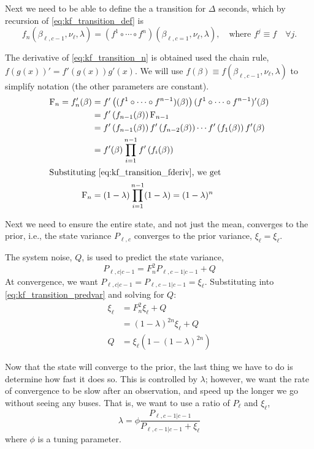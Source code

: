 \documentclass[english]{MastersDoctoralThesis}\usepackage[]{graphicx}\usepackage[]{color}
\begin{document}
Next we need to be able to define the a transition for $\Delta$ seconds,
which by recursion of \ref{eq:kf_transition_def} is
\begin{equation}
    \label{eq:kf_transition_n}
    f_n(\beta_{\ell,c-1}, \nu_\ell, \lambda) =
    (f^1 \circ \cdots \circ f^n)(\beta_{\ell,c=1}, \nu_\ell, \lambda), \quad\text{where } f^j\equiv f\quad \forall j.
\end{equation}

The derivative of \ref{eq:kf_transition_n} is obtained used the chain rule,
$f(g(x))' = f'(g(x)) g'(x)$.
We will use $f(\beta) \equiv f(\beta_{\ell,c-1},\nu_\ell,\lambda)$ to simplify notation
(the other parameters are constant).
\begin{align}
    \label{eq:kf_transition_F}
    \mathrm{F}_n = f'_n(\beta) &=
    f'\left((f^1\circ\cdots\circ f^{n-1})(\beta)\right)(f^1\circ\cdots\circ f^{n-1})'(\beta) \nonumber \\
    &= f'\left(f_{n-1}(\beta)\right) \mathrm{F}_{n-1} \nonumber \\
    &= f'\left(f_{n-1}(\beta)\right) f'\left(f_{n-2}(\beta)\right) \cdots f'\left(f_1(\beta)\right) f'(\beta) \nonumber \\
    &= f'(\beta) \prod_{i=1}^{n-1} f'\left(f_i(\beta)\right) \nonumber \\
\intertext{Substituting \ref{eq:kf_transition_fderiv}, we get}
    \mathrm{F}_n &= (1-\lambda) \prod_{i=1}^{n-1}(1-\lambda) = (1-\lambda)^n
\end{align}


Next we need to ensure the entire state, and not just the mean,
converges to the prior,
i.e., the state variance $P_{\ell,c}$ converges to the prior variance, $\xi_{\ell} = \xi_\ell$.

The system noise, $Q$, is used to predict the state variance,
\begin{equation}
    \label{eq:kf_transition_predvar}
    P_{\ell,c|c-1} = F_n^2 P_{\ell,c-1|c-1} + Q
\end{equation}
At convergence, we want $P_{\ell,c|c-1} = P_{\ell,c-1|c-1} = \xi_\ell$.
Substituting into \ref{eq:kf_transition_predvar} and solving for $Q$:
\begin{align}
    \label{eq:kf_transition_Q}
    \xi_\ell &= F^2_n\xi_\ell + Q \nonumber \\
    &= (1-\lambda)^{2n}\xi_\ell + Q \nonumber \\
    Q &= \xi_\ell(1 - (1 - \lambda)^{2n})
\end{align}

Now that the state will converge to the prior,
the last thing we have to do is determine how fast it does so.
This is controlled by $\lambda$;
however, we want the rate of convergence to be slow
after an observation, and speed up the longer we go without seeing any buses.
That is, we want to use a ratio of $P_\ell$ and $\xi_\ell$,
\begin{equation}
    \label{eq:kf_transition_lambda}
    \lambda = \phi \frac{P_{\ell,c-1|c-1}}{P_{\ell,c-1|c-1} + \xi_\ell}
\end{equation}
where $\phi$ is a tuning parameter.
\end{document}
